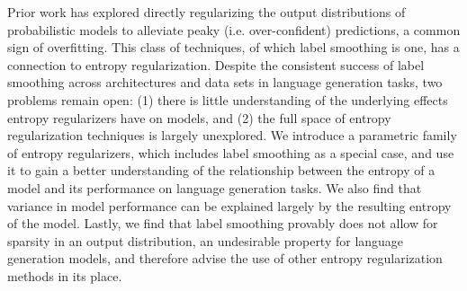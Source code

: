 Prior work has explored directly regularizing the output distributions of probabilistic models to alleviate peaky (i.e. over-confident) predictions, a common sign of overfitting. This class of techniques, of which label smoothing is one, has a connection to entropy regularization. Despite the consistent success of label smoothing across architectures and data sets in language generation tasks, two problems remain open: (1) there is little understanding of the underlying effects entropy regularizers have on models, and (2) the full space of entropy regularization techniques is largely unexplored. We introduce a parametric family of entropy regularizers, which includes label smoothing as a special case, and use it to gain a better understanding of the relationship between the entropy of a model and its performance on language generation tasks. We also find that variance in model performance can be explained largely by the resulting entropy of the model. Lastly, we find that label smoothing provably does not allow for sparsity in an output distribution, an undesirable property for language generation models, and therefore advise the use of other entropy regularization methods in its place.
